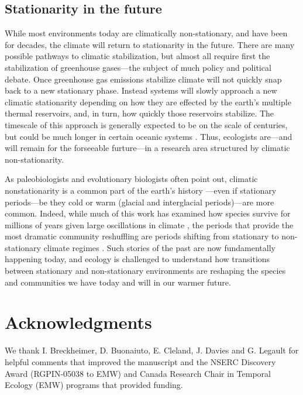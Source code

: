 \documentclass[11pt,letterpaper]{article}
\begin{document}
\subsection{Stationarity in the future}

While most environments today are climatically non-stationary, and have been for decades, the climate will return to stationarity in the future. There are many possible pathways to climatic stabilization, but almost all require first the stabilization of greenhouse gases---the subject of much policy and political debate. Once greenhouse gas emissions stabilize climate will not quickly snap back to a new stationary phase. Instead systems will slowly approach a new climatic stationarity depending on how they are effected by the earth's multiple thermal reservoirs, and, in turn, how quickly those reservoirs stabilize. The timescale of this approach is generally expected to be on the scale of centuries, but could be much longer in certain oceanic systems \citep{ipcc2013ch12}. Thus, ecologists are---and will remain for the forseeable furture---in a research area structured by climatic non-stationarity. 

As paleobiologists and evolutionary biologists often point out, climatic nonstationarity is a common part of the earth's history \citep{Jansson:2002nz}---even if stationary periods---be they cold or warm (glacial and interglacial periods)---are more common. Indeed, while much of this work has examined how species survive for millions of years given large oscillations in climate \citep{provan2008}, the periods that provide the most dramatic community reshuffling are periods shifting from stationary to non-stationary climate regimes \citep{vrba1980,vrba1985}. Such stories of the past are now fundamentally happening today, and ecology is challenged to understand how transitions between stationary and non-stationary environments are reshaping the species and communities we have today and will in our warmer future. 

\section{Acknowledgments}
We thank I. Breckheimer, D. Buonaiuto, E. Cleland, J. Davies and G. Legault for helpful comments that improved the manuscript and the NSERC Discovery Award (RGPIN-05038 to EMW) and Canada Research Chair in Temporal Ecology (EMW) programs that provided funding. 

\end{document}
